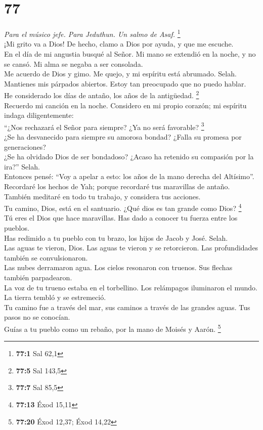 \hypertarget{section-75}{%
\section{77}\label{section-75}}

\emph{Para el músico jefe. Para Jeduthun. Un salmo de Asaf.}
\footnote{\textbf{77:1} Sal 62,1}\\
 ¡Mi grito va a Dios! De hecho, clamo a Dios por ayuda, y
que me escuche.\\
 En el día de mi angustia busqué al Señor. Mi mano se
extendió en la noche, y no se cansó. Mi alma se negaba a ser
consolada.\\
 Me acuerdo de Dios y gimo. Me quejo, y mi espíritu está
abrumado. Selah.\\
 Mantienes mis párpados abiertos. Estoy tan preocupado que
no puedo hablar.\\
 He considerado los días de antaño, los años de la
antigüedad. \footnote{\textbf{77:5} Sal 143,5}\\
 Recuerdo mi canción en la noche. Considero en mi propio
corazón; mi espíritu indaga diligentemente:\\
 ``¿Nos rechazará el Señor para siempre? ¿Ya no será
favorable? \footnote{\textbf{77:7} Sal 85,5}\\
 ¿Se ha desvanecido para siempre su amorosa bondad? ¿Falla
su promesa por generaciones?\\
 ¿Se ha olvidado Dios de ser bondadoso? ¿Acaso ha retenido
su compasión por la ira?'' Selah.\\
 Entonces pensé: ``Voy a apelar a esto: los años de la
mano derecha del Altísimo''.\\
 Recordaré los hechos de Yah; porque recordaré tus
maravillas de antaño.\\
 También meditaré en todo tu trabajo, y considera tus
acciones.\\
 Tu camino, Dios, está en el santuario. ¿Qué dios es tan
grande como Dios? \footnote{\textbf{77:13} Éxod 15,11}\\
 Tú eres el Dios que hace maravillas. Has dado a conocer
tu fuerza entre los pueblos.\\
 Has redimido a tu pueblo con tu brazo, los hijos de
Jacob y José. Selah.\\
 Las aguas te vieron, Dios. Las aguas te vieron y se
retorcieron. Las profundidades también se convulsionaron.\\
 Las nubes derramaron agua. Los cielos resonaron con
truenos. Sus flechas también parpadearon.\\
 La voz de tu trueno estaba en el torbellino. Los
relámpagos iluminaron el mundo. La tierra tembló y se estremeció.\\
 Tu camino fue a través del mar, sus caminos a través de
las grandes aguas. Tus pasos no se conocían.\\
 Guías a tu pueblo como un rebaño, por la mano de Moisés
y Aarón. \footnote{\textbf{77:20} Éxod 12,37; Éxod 14,22}

